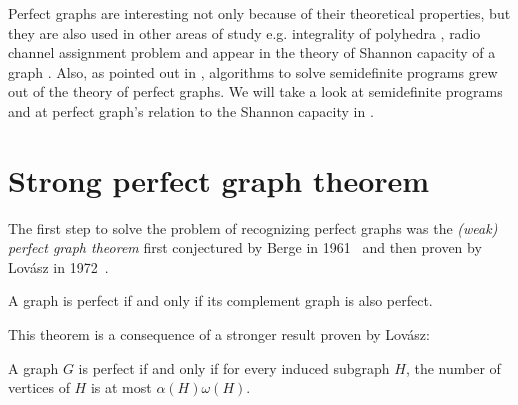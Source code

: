 Perfect graphs are interesting not only because of their theoretical properties, but they are also used in other areas of study e.g. integrality of polyhedra \cite{Chvtal1975, Chudnovsky2003}, radio channel assignment problem \cite{McDiarmid99, McDiarmid2000} and appear in the theory of Shannon capacity of a graph \cite{Lovasz1979}. Also, as pointed out in \cite{alfonsinPerfect2001, Chudnovsky2003}, algorithms to solve semidefinite programs grew out of the theory of perfect graphs. We will take a look at semidefinite programs and at perfect graph's relation to the Shannon capacity in .

\section{Strong perfect graph theorem}
\label{sec:SPGT}

The first step to solve the problem of recognizing perfect graphs was the \emph{(weak) perfect graph theorem} first conjectured by Berge in 1961~\cite{CB61} and then proven by Lovász in 1972~\cite{LL72}.

\begin{theorem}
	\label{thm:pgt}
	A graph is perfect if and only if its complement graph is also perfect.
\end{theorem}

This theorem is a consequence of a stronger result proven by Lovász:
\begin{theorem}
	\label{thm:omegaalpha}
	A graph $G$ is perfect if and only if for every induced subgraph $H$, the number of vertices of $H$ is at most $\alpha(H)\omega(H)$.
\end{theorem}



